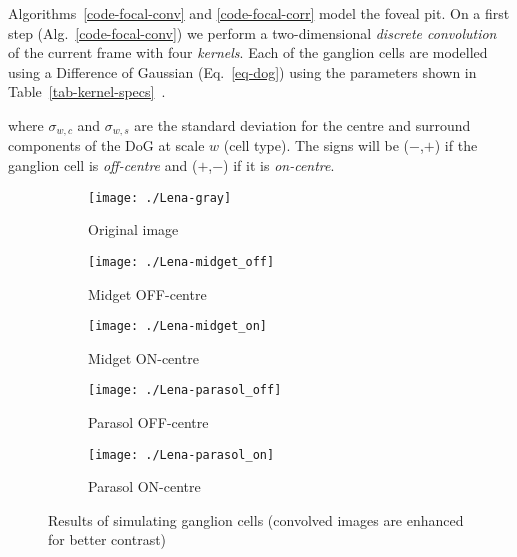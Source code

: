 Algorithms~\ref{code-focal-conv} and \ref{code-focal-corr} model the foveal 
pit. On a first step (Alg.~\ref{code-focal-conv}) we perform a two-dimensional 
\emph{discrete convolution} of the current frame with four \emph{kernels}. 
Each of the ganglion cells are modelled using a Difference of Gaussian 
(Eq.~\ref{eq-dog}) using the parameters shown in 
Table~\ref{tab-kernel-specs}~\cite{field-sensory-coding,basab-model}.

where $\sigma_{w,c}$ and $\sigma_{w,s}$ are the standard deviation for the 
centre and surround components of the DoG at scale $w$ (cell type). The signs 
will be ($-$,$+$) if the ganglion cell is \emph{off-centre} and ($+$,$-$) if it 
is \emph{on-centre}.\\

\begin{figure}[hbt]
  \centering
  \begin{subfigure}[t]{0.32\textwidth}
    \centering
    \captionsetup{justification=centering,margin=0.1cm}
    \texttt{[image: ./Lena-gray]}
    \caption{Original image}
    \label{pic-lena}
  \end{subfigure}
  \begin{subfigure}[t]{0.32\textwidth}
    \centering
    \captionsetup{justification=centering,margin=0.1cm}
    \texttt{[image: ./Lena-midget\_off]}
    \caption{Midget OFF-centre}
    \label{pic-lena-M-OFF}
  \end{subfigure}
  \begin{subfigure}[t]{0.32\textwidth}
    \centering
    \captionsetup{justification=centering,margin=0.1cm}
    \texttt{[image: ./Lena-midget\_on]}
    \caption{Midget ON-centre}
    \label{pic-lena-M-ON}
  \end{subfigure}
  \begin{subfigure}[t]{0.32\textwidth}
    \vspace*{0.8em}
    \centering
    \captionsetup{justification=centering,margin=0.1cm}
    \texttt{[image: ./Lena-parasol\_off]}
    \caption{Parasol OFF-centre}
    \label{pic-lena-P-OFF}
  \end{subfigure}
  \begin{subfigure}[t]{0.32\textwidth}
    \vspace*{0.8em}
    \centering
    \captionsetup{justification=centering,margin=0.1cm}
    \texttt{[image: ./Lena-parasol\_on]}
    \caption{Parasol ON-centre}
    \label{pic-lena-P-ON}
  \end{subfigure}
  \caption{Results of simulating ganglion cells (convolved images are enhanced for better contrast)}
  \label{fig-convolution-results}
\end{figure}
